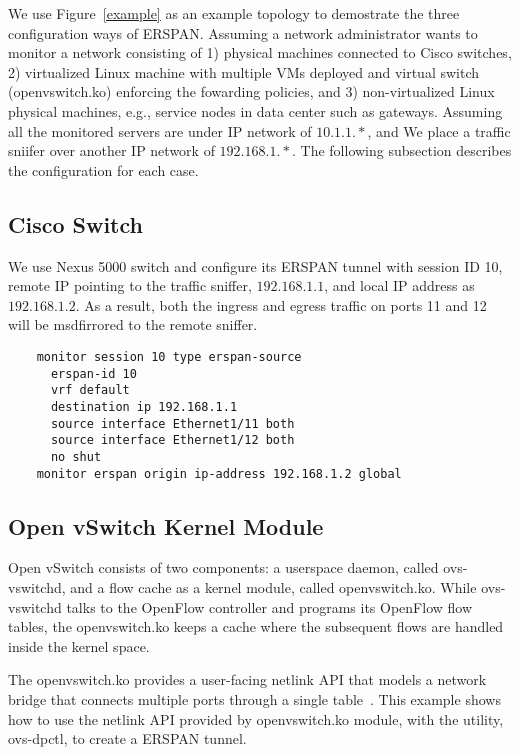 \documentclass[10pt]{sigplanconf}
\begin{document}
We use Figure~\ref{example} as an example topology to demostrate
the three configuration ways of ERSPAN.
Assuming a network administrator wants to monitor a network consisting
of 1) physical machines connected to Cisco switches, 2)
virtualized Linux machine with multiple VMs deployed and virtual switch
(openvswitch.ko) enforcing the fowarding policies, and
3) non-virtualized Linux physical machines, e.g., service nodes
in data center such as gateways.
Assuming all the monitored servers are under IP network of $10.1.1.*$,
and We place a traffic sniifer over another IP network of $192.168.1.*$.
The following subsection describes the configuration for each case.

\subsection{Cisco Switch}
We use Nexus 5000 switch and configure its ERSPAN tunnel
with session ID 10, remote IP pointing to the traffic sniffer, $192.168.1.1$,
and local IP address as $192.168.1.2$.  As a result, both the ingress and
egress traffic on ports 11 and 12 will be msdfirrored to the remote sniffer.

{\footnotesize
\begin{verbatim}
    monitor session 10 type erspan-source
      erspan-id 10
      vrf default
      destination ip 192.168.1.1
      source interface Ethernet1/11 both
      source interface Ethernet1/12 both
      no shut
    monitor erspan origin ip-address 192.168.1.2 global
\end{verbatim}
}

\subsection{Open vSwitch Kernel Module}\label{ovs}
Open vSwitch consists of two components: a userspace daemon, called ovs-vswitchd,
and a flow cache as a kernel module, called openvswitch.ko.  While ovs-vswitchd
talks to the OpenFlow controller and programs its OpenFlow flow tables,
the openvswitch.ko keeps a cache where the subsequent flows are handled
inside the kernel space.

The openvswitch.ko provides a user-facing netlink API that models a network
bridge that connects multiple ports through a single table~\cite{ovswoovs}.
This example shows how to use the netlink API provided by openvswitch.ko
module, with the utility, ovs-dpctl, to create a ERSPAN tunnel.
\end{document}
